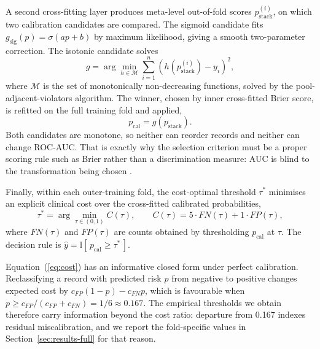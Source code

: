 \documentclass[conference]{IEEEtran}
\begin{document}
A second cross-fitting layer produces meta-level out-of-fold scores $p_{\mathrm{stack}}^{(i)}$, on which two calibration candidates are compared. The sigmoid candidate fits $g_{\mathrm{sig}}(p) = \sigma(ap+b)$ by maximum likelihood, giving a smooth two-parameter correction. The isotonic candidate solves
\begin{equation}
g = \arg\min_{h\in\mathcal{M}} \sum_{i=1}^{n} \left(h\!\left(p_{\mathrm{stack}}^{(i)}\right)-y_i\right)^2, \label{eq:isotonic}
\end{equation}
where $\mathcal{M}$ is the set of monotonically non-decreasing functions, solved by the pool-adjacent-violators algorithm. The winner, chosen by inner cross-fitted Brier score, is refitted on the full training fold and applied,
\begin{equation}
p_{\mathrm{cal}} = g(p_{\mathrm{stack}}). \label{eq:cal}
\end{equation}
Both candidates are monotone, so neither can reorder records and neither can change ROC-AUC. That is exactly why the selection criterion must be a proper scoring rule such as Brier rather than a discrimination measure: AUC is blind to the transformation being chosen \cite{b32}.

Finally, within each outer-training fold, the cost-optimal threshold $\tau^{*}$ minimises an explicit clinical cost over the cross-fitted calibrated probabilities,
\begin{equation}
\tau^{*} = \arg\min_{\tau\in(0,1)} C(\tau), \qquad C(\tau) = 5\cdot FN(\tau) + 1\cdot FP(\tau), \label{eq:cost}
\end{equation}
where $FN(\tau)$ and $FP(\tau)$ are counts obtained by thresholding $p_{\mathrm{cal}}$ at $\tau$. The decision rule is $\hat{y} = \mathbb{I}[\,p_{\mathrm{cal}} \geq \tau^{*}\,]$.

Equation~(\ref{eq:cost}) has an informative closed form under perfect calibration. Reclassifying a record with predicted risk $p$ from negative to positive changes expected cost by $c_{FP}(1-p) - c_{FN}p$, which is favourable when $p \geq c_{FP}/(c_{FP}+c_{FN}) = 1/6 \approx 0.167$. The empirical thresholds we obtain therefore carry information beyond the cost ratio: departure from 0.167 indexes residual miscalibration, and we report the fold-specific values in Section~\ref{sec:results-full} for that reason.
\end{document}
